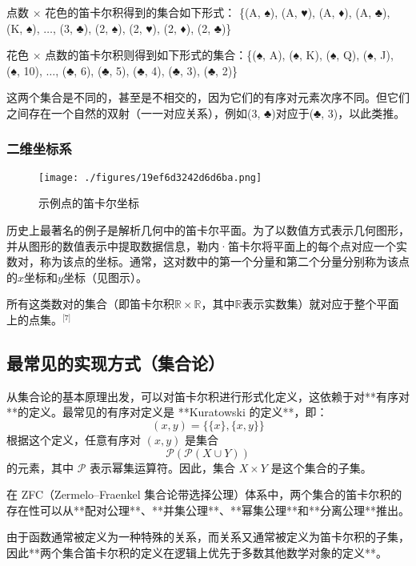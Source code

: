 点数 × 花色的笛卡尔积得到的集合如下形式：  
\{(A, ♠), (A, ♥), (A, ♦), (A, ♣), (K, ♠), \(\ldots\), (3, ♣), (2, ♠), (2, ♥), (2, ♦), (2, ♣)\}

花色 × 点数的笛卡尔积则得到如下形式的集合：\{(♠, A), (♠, K), (♠, Q), (♠, J), (♠, 10), \(\ldots\), (♣, 6), (♣, 5), (♣, 4), (♣, 3), (♣, 2)\}

这两个集合是不同的，甚至是不相交的，因为它们的有序对元素次序不同。但它们之间存在一个自然的双射（一一对应关系），例如(3, ♣)对应于(♣, 3)，以此类推。
\subsubsection{二维坐标系}
\begin{figure}[ht]
\centering
\texttt{[image: ./figures/19ef6d3242d6d6ba.png]}
\caption{示例点的笛卡尔坐标} \label{fig_DKR_2}
\end{figure}
历史上最著名的例子是解析几何中的笛卡尔平面。为了以数值方式表示几何图形，并从图形的数值表示中提取数据信息，勒内·笛卡尔将平面上的每个点对应一个实数对，称为该点的坐标。通常，这对数中的第一个分量和第二个分量分别称为该点的\(x\)坐标和\(y\)坐标（见图示）。

所有这类数对的集合（即笛卡尔积\( \mathbb{R} \times \mathbb{R} \)，其中\( \mathbb{R} \)表示实数集）就对应于整个平面上的点集。\(^\text{[7]}\)
\subsection{最常见的实现方式（集合论）}  
从集合论的基本原理出发，可以对笛卡尔积进行形式化定义，这依赖于对**有序对**的定义。最常见的有序对定义是 **Kuratowski 的定义**，即：\[
(x, y) = \{\{x\}, \{x, y\}\}
\]  
根据这个定义，任意有序对 \( (x, y) \) 是集合  
\[
\mathcal{P}(\mathcal{P}(X \cup Y))
\]  
的元素，其中 \( \mathcal{P} \) 表示幂集运算符。因此，集合 \( X \times Y \) 是这个集合的子集。

在 ZFC（Zermelo–Fraenkel 集合论带选择公理）体系中，两个集合的笛卡尔积的存在性可以从**配对公理**、**并集公理**、**幂集公理**和**分离公理**推出。

由于函数通常被定义为一种特殊的关系，而关系又通常被定义为笛卡尔积的子集，因此**两个集合笛卡尔积的定义在逻辑上优先于多数其他数学对象的定义**。